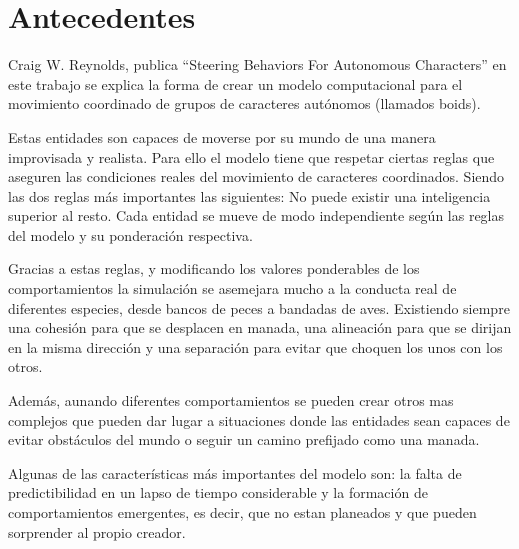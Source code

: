 \section{Antecedentes}
\label{section:antecedentes}

Craig W. Reynolds, publica “Steering Behaviors For Autonomous Characters” en este trabajo se explica la forma de crear un modelo computacional para el movimiento 
coordinado de grupos de caracteres autónomos (llamados boids).
 
Estas entidades son capaces de moverse por su mundo de una manera improvisada y realista. Para ello el modelo tiene que respetar ciertas reglas que aseguren las condiciones reales 
del movimiento de caracteres coordinados. Siendo las dos reglas más importantes las siguientes:
No puede existir una inteligencia superior al resto.
Cada entidad se mueve de modo independiente según las reglas del modelo y su ponderación respectiva.
 
Gracias a estas reglas, y modificando los valores ponderables de los comportamientos la simulación se asemejara mucho a la conducta real de diferentes especies, desde bancos de 
peces a bandadas de aves. Existiendo siempre una cohesión para que se desplacen en manada, una alineación para que se dirijan en la misma dirección y una separación para evitar que
choquen los unos con los otros.
 
Además, aunando diferentes comportamientos se pueden crear otros mas complejos que pueden dar lugar a situaciones donde las entidades sean capaces de evitar obstáculos del mundo o 
seguir un camino prefijado como una manada.
 
Algunas de las características más importantes del modelo son: la falta de predictibilidad en un lapso de tiempo considerable y la formación de comportamientos emergentes, es decir, 
que no estan planeados y que pueden sorprender al propio creador.


